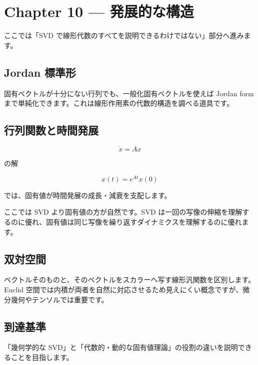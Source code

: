\documentclass[
  11pt,
  a4paper,
]{ltjsarticle}
\author{}
\date{}
\begin{document}
\hypertarget{chapter-10-ux767aux5c55ux7684ux306aux69cbux9020}{%
\section{Chapter 10 ---
発展的な構造}\label{chapter-10-ux767aux5c55ux7684ux306aux69cbux9020}}

ここでは「SVD
で線形代数のすべてを説明できるわけではない」部分へ進みます。

\hypertarget{jordan-ux6a19ux6e96ux5f62}{%
\subsection{Jordan 標準形}\label{jordan-ux6a19ux6e96ux5f62}}

固有ベクトルが十分にない行列でも、一般化固有ベクトルを使えば Jordan form
まで単純化できます。これは線形作用素の代数的構造を調べる道具です。

\hypertarget{ux884cux5217ux95a2ux6570ux3068ux6642ux9593ux767aux5c55}{%
\subsection{行列関数と時間発展}\label{ux884cux5217ux95a2ux6570ux3068ux6642ux9593ux767aux5c55}}

\[
\dot x=Ax
\]

の解

\[
x(t)=e^{At}x(0)
\]

では、固有値が時間発展の成長・減衰を支配します。

ここでは SVD より固有値の方が自然です。SVD
は一回の写像の伸縮を理解するのに優れ、固有値は同じ写像を繰り返すダイナミクスを理解するのに優れます。

\hypertarget{ux53ccux5bfeux7a7aux9593}{%
\subsection{双対空間}\label{ux53ccux5bfeux7a7aux9593}}

ベクトルそのものと、そのベクトルをスカラーへ写す線形汎関数を区別します。Euclid
空間では内積が両者を自然に対応させるため見えにくい概念ですが、微分幾何やテンソルでは重要です。

\hypertarget{ux5230ux9054ux57faux6e96}{%
\subsection{到達基準}\label{ux5230ux9054ux57faux6e96}}

「幾何学的な
SVD」と「代数的・動的な固有値理論」の役割の違いを説明できることを目指します。
\end{document}

